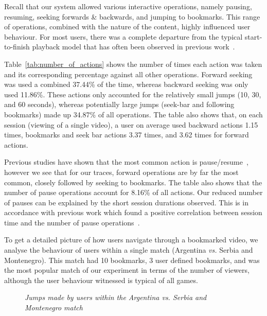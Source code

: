 \documentclass[letterpaper,nocopyrightspace]{sig-alternate}
\newcommand{\capttext}{\protect\centering\em}
\begin{document}
Recall that our system allowed various interactive operations,
namely pausing, resuming, seeking forwards \& backwards, and jumping
to bookmarks. This range of operations, combined with the nature of
the content, highly influenced user behaviour. For most users, there
was a complete departure from the typical start-to-finish playback
model that has often been observed in previous
work~\cite{Costa04Analyzing}.


Table~\ref{tab:number_of_actions} shows the number of times each
action was taken and its corresponding percentage against all other
operations. Forward seeking was used a combined 37.44\% of the time,
whereas backward seeking was only used 11.86\%. These actions only
accounted for the relatively small jumps (10, 30, and 60 seconds),
whereas potentially large jumps (seek-bar and following bookmarks)
made up 34.87\% of all operations. The table also shows that, on
each session (viewing of a single video), a user on average used
backward actions 1.15 times, bookmarks and seek bar actions 3.37
times, and 3.62 times for forward actions.

Previous studies have shown that the most common action is
pause/resume~\cite{Costa04Analyzing}, however we see that for our
traces, forward operations are by far the most common, closely
followed by seeking to bookmarks. The table also shows that the
number of pause operations account for 8.16\% of all actions. Our
reduced number of pauses can be explained by the short session
durations observed. This is in accordance with previous work which
found a positive correlation between session time and the number of
pause operations~\cite{vilas2005user}.

To get a detailed picture of how users navigate through a bookmarked
video, we analyse the behaviour of users within a single match
(Argentina \emph{vs.} Serbia and Montenegro). This
match had 10 bookmarks, 3 user defined bookmarks, and was the most
popular match of our experiment in terms of the number of viewers,
although the user behaviour witnessed is typical of all games.

\begin{figure}[tb]
\centering {} \caption{\capttext Jumps made by users within
the Argentina vs. Serbia and Montenegro match}
\label{fig:argscg_jumps}
\end{figure}
\end{document}
